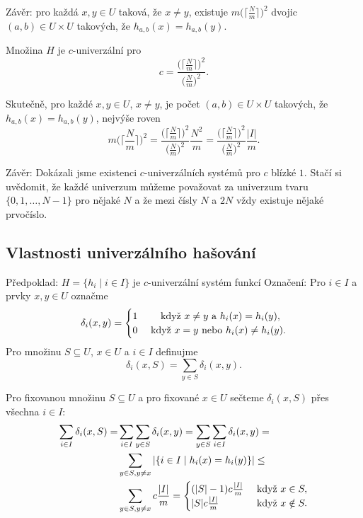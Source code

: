 \documentclass[a4paper,12pt]{article}
\begin{document}
Závěr: pro každá $x,y\in U$ taková, že 
$x\ne y$, existuje $m\big(\lceil\frac Nm\rceil\big)^2$ dvojic $(a
,b)\in U\times U$ takových, že 
$h_{a,b}(x)=h_{a,b}(y)$.

\begin{veta}Množina $H$ je $c$-univerzální pro 
$$c=\frac {\big(\lceil\frac Nm\rceil\big)^2}{\big(\frac Nm\big)^2}
.$$
\end{veta}

Skutečně, pro každé $x,y\in U$, $x\ne y$, je počet 
$(a,b)\in U\times U$ takových, že $h_{a,b}(x)=h_{a,b}(y)$, nejvýše roven
$$m\big(\lceil\frac Nm\rceil\big)^2=\frac {\big(\lceil\frac Nm\rceil\big
)^2}{\big(\frac Nm\big)^2}\frac {N^2}m=\frac {\big(\lceil\frac Nm
\rceil\big)^2}{\big(\frac Nm\big)^2}\frac {|I|}m.$$

Závěr: Dokázali jsme existenci $c$-univerzálních 
systémů pro $c$ blízké $1$. Stačí si uvědomit, že  každé univerzum můžeme 
považovat za univerzum tvaru $\{0,1,\dots,N-1\}$ pro nějaké 
$N$ a že mezi čísly $N$ a $2N$ vždy existuje nějaké 
prvočíslo.

\subsection{
Vlastnosti univerzálního hašování
}

Předpoklad: $H=\{h_i\mid i\in I\}$ je $c$-univerzální systém funkcí\newline 
Označení: Pro $i\in I$ a prvky $x,y\in U$ 
označme 
$$\delta_i(x,y)=\begin{cases} 1&\quad\text{\rm\ když }x\ne y\text{\rm\ a }
h_i(x)=h_i(y),\\
0&\text{\rm\ když }x=y\text{\rm\ nebo }h_i(x)\ne h_i(y).\end{cases} $$
Pro množinu $S\subseteq U$, $x\in U$ a $i\in I$ definujme
$$\delta_i(x,S)=\sum_{y\in S}\delta_i(x,y).$$

Pro fixovanou množinu $S\subseteq U$ a pro fixované $
x\in U$ sečteme
$\delta_i(x,S)$ přes všechna $i\in I$:
\begin{align*}\sum_{i\in I}\delta_i(x,S)=&\sum_{i\in I}\sum_{y\in S}\delta_
i(x,y)=\sum_{y\in S}\sum_{i\in I}\delta_i(x,y)=\\
&\sum_{y\in S,y\ne x}|\{i\in I\mid h_i(x)=h_i(y)\}|\le\\
&\sum_{y\in S,y\ne x}c\frac {|I|}m=\begin{cases} (|S|-1)c\frac {|I|}m&\text{\rm\ když }
x\in S,\\
|S|c\frac {|I|}m&\text{\rm\ když }x\notin S.\end{cases} \end{align*}
\end{document}
